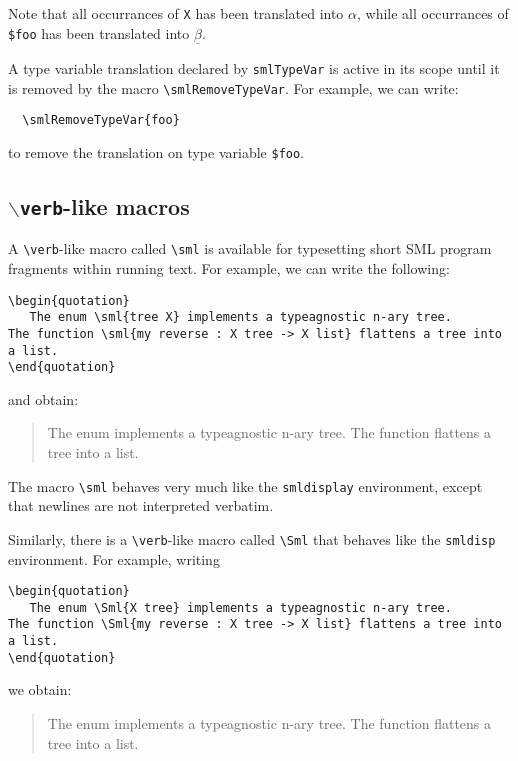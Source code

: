 \documentclass{article}
\begin{document}
Note that all occurrances of \verb|X| has been translated into
$\alpha$, while all occurrances of \verb|$foo| has been translated
into $\underline\beta$.

A type variable translation declared by \verb|smlTypeVar| is active
in its scope until it is removed by 
the macro \verb|\smlRemoveTypeVar|.
For example, we can write:
\begin{verbatim}
  \smlRemoveTypeVar{foo}
\end{verbatim}
to remove the translation on type variable \verb|$foo|.


\subsection{{\tt $\backslash${verb}}-like macros}
A \verb|\verb|-like macro called \verb|\sml| is available for typesetting
short SML program fragments within running text.  
For example, we can write the following:
\begin{verbatim}
\begin{quotation}
   The enum \sml{tree X} implements a typeagnostic n-ary tree.
The function \sml{my reverse : X tree -> X list} flattens a tree into a list.
\end{quotation}
\end{verbatim}
and obtain:
\begin{quotation}
   The enum  implements a typeagnostic n-ary tree.
The function  flattens a tree into a list.
\end{quotation}
The macro \verb|\sml| behaves very much like the \verb|smldisplay|
environment, except that newlines are not interpreted verbatim.

Similarly, there is a \verb|\verb|-like macro called \verb|\Sml| that
behaves like the \verb|smldisp| environment.  For example, writing
\begin{verbatim}
\begin{quotation}
   The enum \Sml{X tree} implements a typeagnostic n-ary tree.
The function \Sml{my reverse : X tree -> X list} flattens a tree into a list.
\end{quotation}
\end{verbatim}
we obtain:
\begin{quotation}
   The enum  implements a typeagnostic n-ary tree.
The function  flattens a tree into a list.
\end{quotation}
\end{document}
